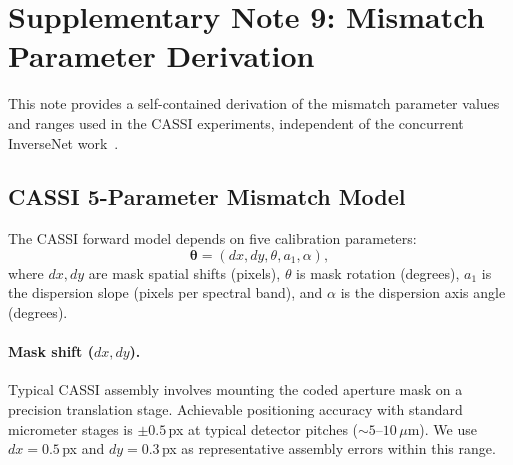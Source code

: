 \documentclass[11pt]{article}
\theoremstyle{definition}
\begin{document}


\newpage
\section{Supplementary Note 9: Mismatch Parameter Derivation}
\label{sec:mismatch_derivation}

This note provides a self-contained derivation of the mismatch parameter
values and ranges used in the CASSI experiments, independent of the
concurrent InverseNet work~\cite{yang2026inversenet}.

\subsection{CASSI 5-Parameter Mismatch Model}

The CASSI forward model depends on five calibration parameters:
\begin{equation}
  \boldsymbol{\theta} = (dx, dy, \theta, a_1, \alpha),
\end{equation}
where $dx, dy$ are mask spatial shifts (pixels), $\theta$ is mask rotation
(degrees), $a_1$ is the dispersion slope (pixels per spectral band), and
$\alpha$ is the dispersion axis angle (degrees).

\paragraph{Mask shift ($dx, dy$).}
Typical CASSI assembly involves mounting the coded aperture mask on a
precision translation stage.  Achievable positioning accuracy with standard
micrometer stages is $\pm 0.5$\,px at typical detector pitches
($\sim 5$--$10\,\mu$m).  We use $dx = 0.5$\,px and $dy = 0.3$\,px as
representative assembly errors within this range.
\end{document}
